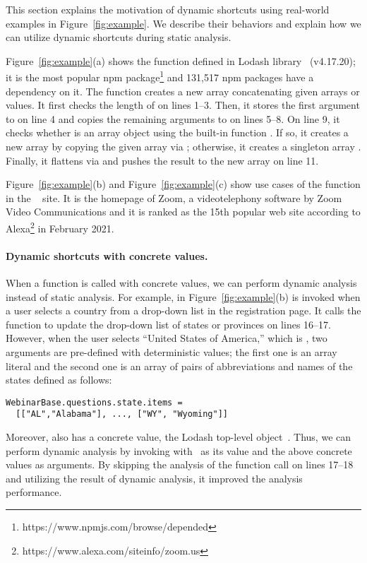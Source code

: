 This section explains the motivation of dynamic shortcuts
using real-world examples in Figure~\ref{fig:example}.
We describe their behaviors and explain how we can utilize
dynamic shortcuts during static analysis.

Figure~\ref{fig:example}(a) shows the  function defined
in Lodash library~\cite{lodash} (v4.17.20); it is
the most popular npm package\footnote{https://www.npmjs.com/browse/depended}
and 131,517 npm packages have a dependency on it.
The  function creates a new array concatenating given arrays or values.
It first checks the length of  on lines 1--3.
Then, it stores the first argument to  on line 4 and
copies the remaining arguments to  on lines 5--8.
On line 9, it checks whether  is an array object using
the built-in function .  If so, it creates a new array
by copying the given array via ; otherwise,
it creates a singleton array \jscode{[array]}.  Finally, it flattens
 via  and pushes the result to the
new array on line 11.

Figure~\ref{fig:example}(b) and Figure~\ref{fig:example}(c) show use
cases of the  function in the ~\cite{zoom} site.
It is the homepage of Zoom, a videotelephony software by Zoom
Video Communications and it is ranked as the 15th popular web site according
to Alexa\footnote{https://www.alexa.com/siteinfo/zoom.us} in February 2021.

\paragraph{Dynamic shortcuts with concrete values.}
When a function is called with concrete values, we can perform
dynamic analysis instead of static analysis.
For example,  in Figure~\ref{fig:example}(b)
is invoked when a user selects a country from a drop-down list in the registration page.
It calls the  function to update the drop-down list of
states or provinces on lines 16--17.  However, when the user selects ``United States of America,''
which is , two arguments are pre-defined with
deterministic values; the first one is an array literal
 and the second one is an array of pairs
of abbreviations and names of the states defined as follows: \\[-.5em]
\begin{lstlisting}[style=myJSstyle,numbers=none]
WebinarBase.questions.state.items =
  [["AL","Alabama"], ..., ["WY", "Wyoming"]]
\end{lstlisting}
\noindent\smallskip
Moreover,  also has a concrete value, the Lodash top-level object~\jscode{\_}.
Thus, we can perform dynamic analysis by invoking  with~\jscode{\_}
as its  value and the above concrete values as arguments. 
By skipping the analysis of the function call on lines 17--18 and
utilizing the result of dynamic analysis, it improved the analysis performance.


